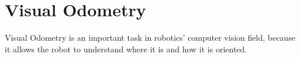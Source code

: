 \section{Visual Odometry}\label{sec:visual-odometry}

Visual Odometry is an important task in robotics' computer vision field, because it allows the robot to understand where it is and how it is oriented.

